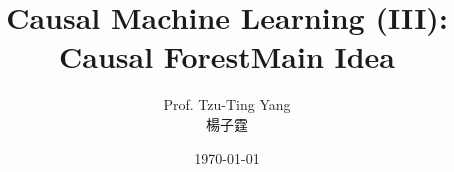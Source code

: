 \documentclass[hyperref={pdfpagelabels=false}]{beamer}
\title[]
{Causal Machine Learning (III): Causal Forest}
\author
{Prof. Tzu-Ting Yang  \\ 楊子霆}
\institute{Institute of Economics, Academia Sinica  \\ 中央研究院經濟研究所}
\date
{\today}
\begin{document}
\begin{frame}{}
	\titlepage
\end{frame}




\title[]
{Main Idea}

\author{}
\institute{}
\date{}

\begin{frame}{}
	\titlepage
\end{frame}




\end{document}
